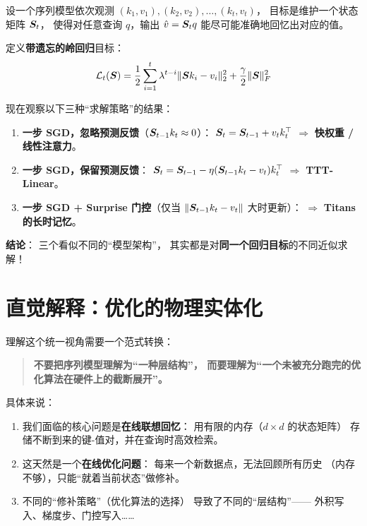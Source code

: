 \begin{toybox}[title=玩具问题 F：从同一个目标函数推导出不同模型]
设一个序列模型依次观测 $(k_1, v_1), (k_2, v_2), \ldots, (k_t, v_t)$，
目标是维护一个状态矩阵 $\boldsymbol{S}_t$，
使得对任意查询 $q$，输出 $\hat{v} = \boldsymbol{S}_t q$ 能尽可能准确地回忆出对应的值。

定义\textbf{带遗忘的岭回归}目标：
\begin{equation}
  \mathcal{L}_t(\boldsymbol{S}) = \frac{1}{2}\sum_{i=1}^{t} \lambda^{t-i} \|\boldsymbol{S} k_i - v_i\|_2^2
  + \frac{\gamma}{2}\|\boldsymbol{S}\|_F^2
  \label{eq:ttr_toy}
\end{equation}

现在观察以下三种``求解策略''的结果：
\begin{enumerate}
  \item \textbf{一步 SGD，忽略预测反馈}（$\boldsymbol{S}_{t-1} k_t \approx 0$）：
    $\boldsymbol{S}_t = \boldsymbol{S}_{t-1} + v_t k_t^\top$
    $\Rightarrow$ \textbf{快权重 / 线性注意力}。

  \item \textbf{一步 SGD，保留预测反馈}：
    $\boldsymbol{S}_t = \boldsymbol{S}_{t-1} - \eta(\boldsymbol{S}_{t-1} k_t - v_t) k_t^\top$
    $\Rightarrow$ \textbf{TTT-Linear}。

  \item \textbf{一步 SGD + Surprise 门控}（仅当 $\|\boldsymbol{S}_{t-1} k_t - v_t\|$ 大时更新）：
    $\Rightarrow$ \textbf{Titans 的长时记忆}。
\end{enumerate}

\textbf{结论}：
三个看似不同的``模型架构''，
其实都是对\textbf{同一个回归目标}的不同近似求解！
\end{toybox}

\section{直觉解释：优化的物理实体化}
\label{sec:ttr_intuition}

理解这个统一视角需要一个范式转换：

\begin{quote}
\textbf{不要把序列模型理解为``一种层结构''，
而要理解为``一个未被充分跑完的优化算法在硬件上的截断展开''。}
\end{quote}

具体来说：
\begin{enumerate}
  \item 我们面临的核心问题是\textbf{在线联想回忆}：
    用有限的内存（$d \times d$ 的状态矩阵）
    存储不断到来的键-值对，并在查询时高效检索。

  \item 这天然是一个\textbf{在线优化问题}：
    每来一个新数据点，无法回顾所有历史
    （内存不够），只能``就着当前状态''做修补。

  \item 不同的``修补策略''（优化算法的选择）
    导致了不同的``层结构''——
    外积写入、梯度步、门控写入……
\end{enumerate}

